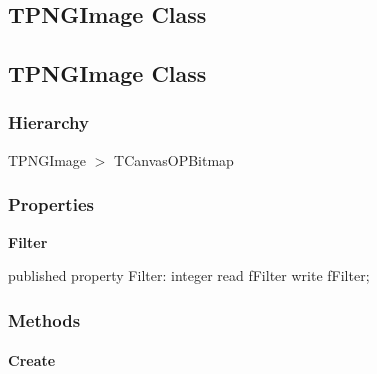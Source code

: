 \documentclass{report}
\newif\ifpdf
\begin{document}
\subsection*{\large{\textbf{TPNGImage Class}}\normalsize\hspace{1ex}\hrulefill}
\else
\subsection*{TPNGImage Class}
\fi
\label{opbitmapformats.TPNGImage}
\subsubsection*{\large{\textbf{Hierarchy}}\normalsize\hspace{1ex}\hfill}
TPNGImage {$>$} TCanvasOPBitmap
\subsubsection*{\large{\textbf{Properties}}\normalsize\hspace{1ex}\hfill}
\begin{list}{}{
\setlength{\itemindent}{0cm}
\setlength{\listparindent}{0cm}
\setlength{\leftmargin}{\evensidemargin}
\addtolength{\leftmargin}{\tmplength}
\settowidth{\labelsep}{X}
\addtolength{\leftmargin}{\labelsep}
\setlength{\labelwidth}{\tmplength}
}
\label{opbitmapformats.TPNGImage-Filter}
\item[\textbf{Filter}\hfill]
\ifpdf
\begin{flushleft}
\fi
\begin{ttfamily}
published property Filter: integer read fFilter write fFilter;\end{ttfamily}

\ifpdf
\end{flushleft}
\fi


\par  \end{list}
\subsubsection*{\large{\textbf{Methods}}\normalsize\hspace{1ex}\hfill}
\paragraph*{Create}\hspace*{\fill}
\end{document}
